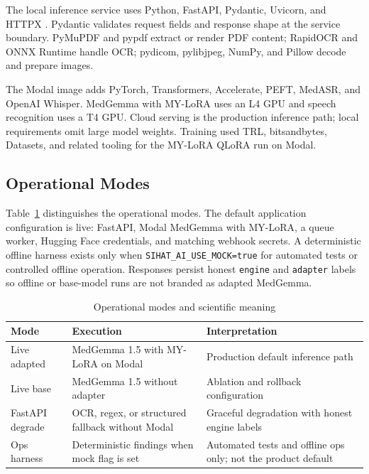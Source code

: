 \documentclass[conference]{IEEEtran}
\begin{document}
The local inference service uses Python, FastAPI, Pydantic, Uvicorn, and HTTPX \cite{fastapi}. Pydantic validates request fields and response shape at the service boundary. PyMuPDF and pypdf extract or render PDF content; RapidOCR and ONNX Runtime handle OCR; pydicom, pylibjpeg, NumPy, and Pillow decode and prepare images.

The Modal image adds PyTorch, Transformers, Accelerate, PEFT, MedASR, and OpenAI Whisper. MedGemma with MY-LoRA uses an L4 GPU and speech recognition uses a T4 GPU. Cloud serving is the production inference path; local requirements omit large model weights. Training used TRL, bitsandbytes, Datasets, and related tooling for the MY-LoRA QLoRA run on Modal.

\subsection{Operational Modes}

Table~\ref{tab:modes} distinguishes the operational modes. The default application configuration is live: FastAPI, Modal MedGemma with MY-LoRA, a queue worker, Hugging Face credentials, and matching webhook secrets. A deterministic offline harness exists only when \texttt{SIHAT\_AI\_USE\_MOCK=true} for automated tests or controlled offline operation. Responses persist honest \texttt{engine} and \texttt{adapter} labels so offline or base-model runs are not branded as adapted MedGemma.

\begin{table}[t]
\caption{Operational modes and scientific meaning}
\label{tab:modes}
\centering
\scriptsize
\begin{tabular}{p{}p{}p{}}
\toprule
Mode & Execution & Interpretation \\
\midrule
Live adapted & MedGemma 1.5 with MY-LoRA on Modal & Production default inference path \\
Live base & MedGemma 1.5 without adapter & Ablation and rollback configuration \\
FastAPI degrade & OCR, regex, or structured fallback without Modal & Graceful degradation with honest engine labels \\
Ops harness & Deterministic findings when mock flag is set & Automated tests and offline ops only; not the product default \\
\bottomrule
\end{tabular}
\end{table}
\end{document}
